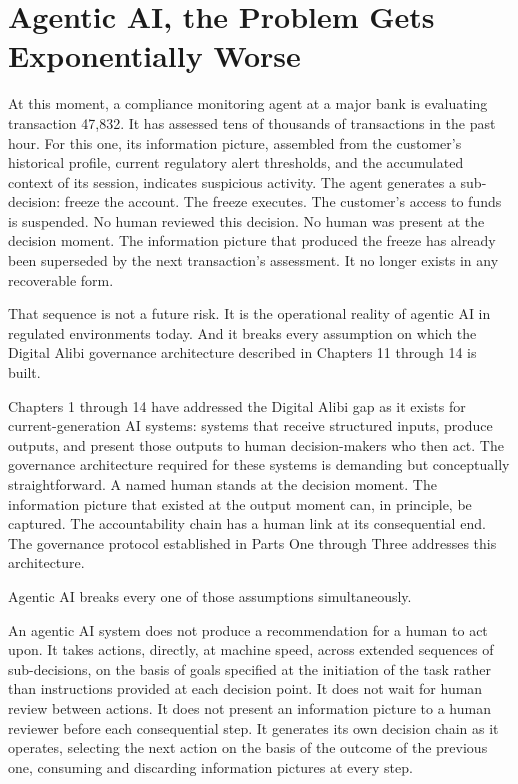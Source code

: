 
\chapter{Agentic AI, the Problem Gets Exponentially Worse}

At this moment, a compliance monitoring agent at a major bank is evaluating transaction 47,832. It has assessed tens of thousands of transactions in the past hour. For this one, its information picture, assembled from the customer's historical profile, current regulatory alert thresholds, and the accumulated context of its session, indicates suspicious activity. The agent generates a sub-decision: freeze the account. The freeze executes. The customer's access to funds is suspended. No human reviewed this decision. No human was present at the decision moment. The information picture that produced the freeze has already been superseded by the next transaction's assessment. It no longer exists in any recoverable form.

That sequence is not a future risk. It is the operational reality of agentic AI in regulated environments today. And it breaks every assumption on which the Digital Alibi governance architecture described in Chapters 11 through 14 is built.

Chapters 1 through 14 have addressed the Digital Alibi gap as it exists for current-generation AI systems: systems that receive structured inputs, produce outputs, and present those outputs to human decision-makers who then act. The governance architecture required for these systems is demanding but conceptually straightforward. A named human stands at the decision moment. The information picture that existed at the output moment can, in principle, be captured. The accountability chain has a human link at its consequential end. The governance protocol established in Parts One through Three addresses this architecture.

Agentic AI breaks every one of those assumptions simultaneously.

An agentic AI system does not produce a recommendation for a human to act upon. It takes actions, directly, at machine speed, across extended sequences of sub-decisions, on the basis of goals specified at the initiation of the task rather than instructions provided at each decision point. It does not wait for human review between actions. It does not present an information picture to a human reviewer before each consequential step. It generates its own decision chain as it operates, selecting the next action on the basis of the outcome of the previous one, consuming and discarding information pictures at every step.

